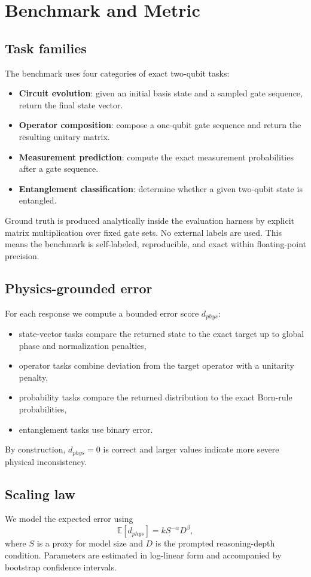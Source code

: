 \documentclass[11pt]{article}
\begin{document}
\section{Benchmark and Metric}
\subsection{Task families}
The benchmark uses four categories of exact two-qubit tasks:
\begin{itemize}
\item \textbf{Circuit evolution}: given an initial basis state and a sampled gate sequence, return the final state vector.
\item \textbf{Operator composition}: compose a one-qubit gate sequence and return the resulting unitary matrix.
\item \textbf{Measurement prediction}: compute the exact measurement probabilities after a gate sequence.
\item \textbf{Entanglement classification}: determine whether a given two-qubit state is entangled.
\end{itemize}

Ground truth is produced analytically inside the evaluation harness by explicit matrix multiplication over fixed gate sets. No external labels are used. This means the benchmark is self-labeled, reproducible, and exact within floating-point precision.

\subsection{Physics-grounded error}
For each response we compute a bounded error score $d_{phys}$:
\begin{itemize}
\item state-vector tasks compare the returned state to the exact target up to global phase and normalization penalties,
\item operator tasks combine deviation from the target operator with a unitarity penalty,
\item probability tasks compare the returned distribution to the exact Born-rule probabilities,
\item entanglement tasks use binary error.
\end{itemize}

By construction, $d_{phys}=0$ is correct and larger values indicate more severe physical inconsistency.

\subsection{Scaling law}
We model the expected error using
\[
\mathbb{E}[d_{phys}] = k S^{-\alpha} D^{\beta},
\]
where $S$ is a proxy for model size and $D$ is the prompted reasoning-depth condition. Parameters are estimated in log-linear form and accompanied by bootstrap confidence intervals.
\end{document}
